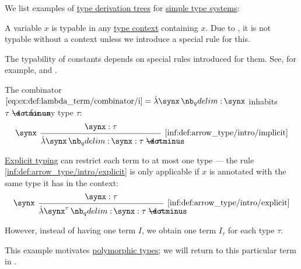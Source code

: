 \begin{example}\label{ex:def:type_derivation_tree}
  We list examples of \hyperref[def:type_derivation_tree]{type derivation trees} for \hyperref[def:simple_type_system]{simple type systems}:
  \begin{thmenum}
     A variable \( x \) is typable in any \hyperref[def:type_context]{type context} containing \( x \). Due to , it is not typable without a context unless we introduce a special rule for this.

     The typability of constants depends on special rules introduced for them. See, for example,  and .

     The combinator \( \ref{eq:ex:def:lambda_term/combinator/i} = \qabs \synx \synx \) inhabits \( \tau \synimplies \tau \) for any type \( \tau \):
    \begin{equation*}
      \begin{prooftree}
        \hypo{ \synx: \tau }
        \infer[left label=\( \synx \)]1[\ref{inf:def:arrow_type/intro/implicit}]{ \qabs \synx \synx: \tau \synimplies \tau }
      \end{prooftree}
    \end{equation*}

    \hyperref[def:simple_type_system_style]{Explicit typing} can restrict each term to at most one type --- the rule \ref{inf:def:arrow_type/intro/explicit} is only applicable if \( x \) is annotated with the same type it has in the context:
    \begin{equation*}
      \begin{prooftree}
        \hypo{ \synx: \tau }
        \infer[left label=\( \synx \)]1[\ref{inf:def:arrow_type/intro/explicit}]{ \qabs {\synx^\tau} \synx: \tau \synimplies \tau }
      \end{prooftree}
    \end{equation*}

    However, instead of having one term \( I \), we obtain one term \( I_\tau \) for each type \( \tau \).

    This example motivates \hyperref[def:polymorphic_typed_lambda_calculus]{polymorphic types}; we will return to this particular term in .


\end{thmenum}
\end{example}
